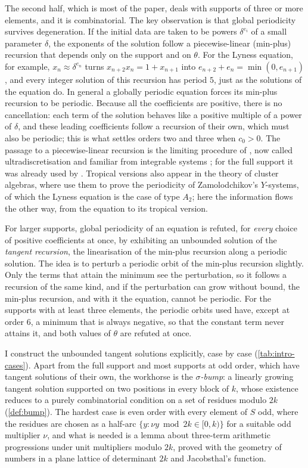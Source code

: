 The second half, which is most of the paper, deals with supports of three
or more elements, and it is combinatorial. The key observation is that
global periodicity survives degeneration. If the initial data are taken
to be powers $\delta^{e_i}$ of a small parameter $\delta$, the exponents of
the solution follow a piecewise-linear (min-plus) recursion that depends
only on the support and on $\theta$. For the Lyness equation, for example,
$x_n\approx\delta^{e_n}$ turns $x_{n+2}x_n=1+x_{n+1}$ into
$e_{n+2}+e_n=\min(0,e_{n+1})$, and every integer solution of this recursion
has period $5$, just as the solutions of the equation do. In general a
globally periodic equation forces its min-plus recursion to be periodic.
Because all the coefficients are positive, there is no cancellation: each
term of the solution behaves like a positive multiple of a power of
$\delta$, and these leading coefficients follow a recursion of their own,
which must also be periodic; this is what settles orders two and three when
$c_0>0$. The passage to a piecewise-linear recursion is the limiting
procedure of \citet{TokihiroTTMS1996}, now called ultradiscretisation and
familiar from integrable systems
\citep{Nobe2008,InoueTakenawa2008,InoueKunibaTakagi2012}; for the full
support it was already used by \citet{CsornyeiLaczkovich2001}. Tropical
versions also appear in the theory of cluster algebras, where
\citet{FominZelevinsky2003} use them to prove the periodicity of
Zamolodchikov's $Y$-systems, of which the Lyness equation is the case of type
$A_2$; here the information flows the other way, from the equation to its
tropical version.

For larger supports, global periodicity of an equation is refuted, for
\emph{every} choice of positive coefficients at once, by exhibiting an
unbounded solution of the \emph{tangent recursion}, the linearisation of the
min-plus recursion along a periodic solution. The idea is to perturb a
periodic orbit of the min-plus recursion slightly. Only the terms that attain
the minimum see the perturbation, so it follows a recursion of the same kind,
and if the perturbation can grow without bound, the min-plus recursion, and
with it the equation, cannot be periodic. For the supports with at least three
elements, the periodic orbits used have, except at order $6$, a minimum that is
always negative, so that the constant term never attains it, and both values of
$\theta$ are refuted at once.

I construct the unbounded tangent solutions explicitly, case by case
(\autoref{tab:intro-cases}). Apart from the full support and most supports
at odd order, which have tangent solutions of their own, the workhorse is the
\emph{$\sigma$-bump}: a linearly growing tangent solution supported on two
positions in every block of $k$, whose existence reduces to a purely
combinatorial condition on a set of residues modulo $2k$
(\autoref{def:bump}). The hardest case is even order with every element of
$S$ odd, where the residues are chosen as a half-arc
$\{y: \nu y \bmod 2k \in [0,k)\}$ for a suitable odd multiplier $\nu$, and
what is needed is a lemma about three-term arithmetic progressions under
unit multipliers modulo $2k$, proved with the geometry of numbers in a plane
lattice of determinant $2k$ and Jacobsthal's function.

